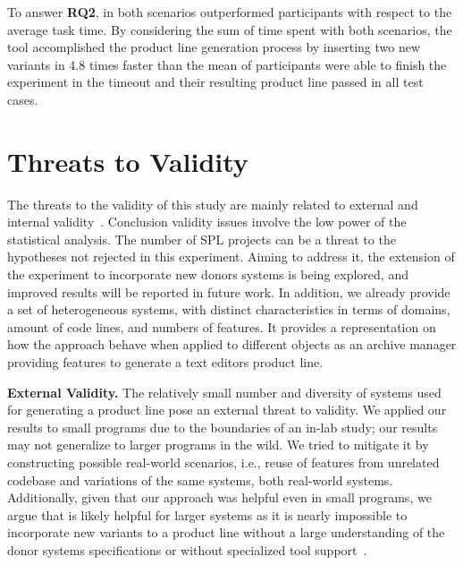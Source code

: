 \begin{framed}
\noindent To answer \textbf{RQ2}, in both scenarios \autoscalpel outperformed participants with respect to the average task time. By considering the sum of time spent with both scenarios, the tool accomplished the product line generation process  by inserting two new variants in 4.8 times faster than the mean of participants were able to finish the experiment in the timeout and their resulting product line passed in all test cases.
\end{framed}

\section{Threats to Validity}

The threats to the validity of this study are mainly related to external and internal validity~\cite{Wohlin2012}. Conclusion validity issues involve the low power of the statistical analysis. The number of SPL projects can be a threat to the hypotheses not rejected in this experiment. Aiming to address it, the extension of the experiment to incorporate new donors systems is being explored, and improved results will be reported in future work. In addition, we already provide a set of heterogeneous systems, with distinct characteristics in terms of domains, amount of code lines, and numbers of features. It provides a representation on how the \autoscalpel approach behave when applied to different objects as an archive manager providing features to generate a text editors product line.

\textbf{External Validity.} The relatively small number and diversity of systems used for generating a product line pose an external threat to validity. We applied our results to small programs due to the boundaries of an in-lab study; our results may not generalize to larger programs in the wild. We tried to mitigate it by constructing possible real-world scenarios, i.e., reuse of features from unrelated codebase and variations of the same systems, both real-world systems. Additionally, given that our approach was helpful even in small programs, we argue that is likely helpful for larger systems as it is nearly impossible to incorporate new variants to a product line without a large understanding of the donor systems specifications or without specialized tool support~\cite{Assuncao2017}.


